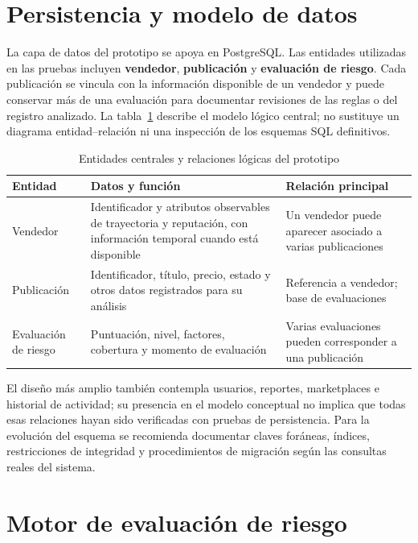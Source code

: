 \section{Persistencia y modelo de datos}\label{sec:ml-persistencia}

La capa de datos del prototipo se apoya en PostgreSQL. Las entidades utilizadas en las pruebas incluyen \textbf{vendedor}, \textbf{publicación} y \textbf{evaluación de riesgo}. Cada publicación se vincula con la información disponible de un vendedor y puede conservar más de una evaluación para documentar revisiones de las reglas o del registro analizado. La tabla~\ref{tab:ml-entidades} describe el modelo lógico central; no sustituye un diagrama entidad--relación ni una inspección de los esquemas SQL definitivos.

\begin{table}[htbp]
\centering
\caption{Entidades centrales y relaciones lógicas del prototipo}
\label{tab:ml-entidades}
\small
\begin{tabularx}{\textwidth}{@{}p{} X X@{}}
\toprule
\textbf{Entidad} & \textbf{Datos y función} & \textbf{Relación principal} \\
\midrule
Vendedor & Identificador y atributos observables de trayectoria y reputación, con información temporal cuando está disponible & Un vendedor puede aparecer asociado a varias publicaciones \\
Publicación & Identificador, título, precio, estado y otros datos registrados para su análisis & Referencia a vendedor; base de evaluaciones \\
Evaluación de riesgo & Puntuación, nivel, factores, cobertura y momento de evaluación & Varias evaluaciones pueden corresponder a una publicación \\
\bottomrule
\end{tabularx}
\end{table}

El diseño más amplio también contempla usuarios, reportes, marketplaces e historial de actividad; su presencia en el modelo conceptual no implica que todas esas relaciones hayan sido verificadas con pruebas de persistencia. Para la evolución del esquema se recomienda documentar claves foráneas, índices, restricciones de integridad y procedimientos de migración según las consultas reales del sistema.

\section{Motor de evaluación de riesgo}\label{sec:ml-motor}

